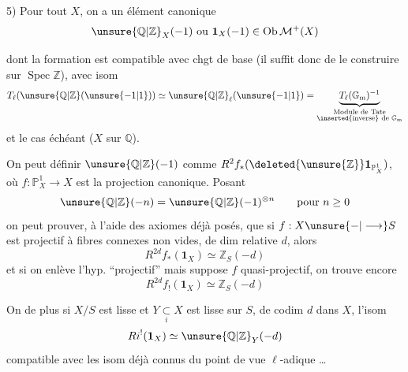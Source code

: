 


5) Pour tout $X$, on a un 
élément canonique
\[
 \unsure{\mathbb{Q}|\mathbb{Z}}_X(-1)\ \text{ou }\mathbf1_X(-1)\in\operatorname{Ob}\mathcal{M}^+(X)
\]

dont la formation est compatible avec chgt
de base (il suffit donc de le construire
sur $\operatorname{Spec}\mathbb{Z}$), avec  isom
\[
 T_\ell(\unsure{\mathbb{Q}|\mathbb{Z}}(\unsure{-1|1}))
 \simeq \unsure{\mathbb{Q}|\mathbb{Z}}_\ell(\unsure{-1|1})
 =\underbrace{T_\ell(\mathbb{G}_{\mathrm m})^{-1}}_{
 \substack{\text{Module de Tate}\\\text{\inserted{inverse} de }\mathbb{G}_{\mathrm m}}}
\]
et le cas échéant ($X$ sur $\mathbb{Q}$).

On peut définir $\unsure{\mathbb{Q}|\mathbb{Z}}(-1)$ comme
$R^2f_*(\deleted{\unsure{\mathbb{Z}}}\mathbf1_{\mathbb{P}^1_X})$,
où $f:\mathbb{P}^1_X\longrightarrow X$ est la
projection canonique. Posant
\[
 \unsure{\mathbb{Q}|\mathbb{Z}}(-n)=\unsure{\mathbb{Q}|\mathbb{Z}}(-1)^{\otimes n}
 \qquad\text{pour }n\ge0
\]
on peut prouver, à l'aide des
axiomes déjà posés, que si $f:X\unsure{-|\longrightarrow}S$
est  projectif à fibres  connexes non vides,
 de dim relative $d$, alors
\[
 R^{2d}f_*(\mathbf1_X)\simeq\mathbb{Z}_S(-d)
\]
et si on enlève l'hyp. ``projectif'' mais
suppose $f$ quasi-projectif, on trouve encore
\[
 R^{2d}f_!(\mathbf1_X)\simeq\mathbb{Z}_S(-d)
\]

On  de plus  si $X/S$ est
lisse et $Y\underset{i}{\subset}X$ est lisse sur $S$, de codim
$d$ dans $X$, l'isom
\[
Ri^!(\mathbf1_X)\simeq \unsure{\mathbb{Q}|\mathbb{Z}}_Y(-d)
\]
compatible avec les isom déjà connus
du point de vue $\ell$-adique \ldots


